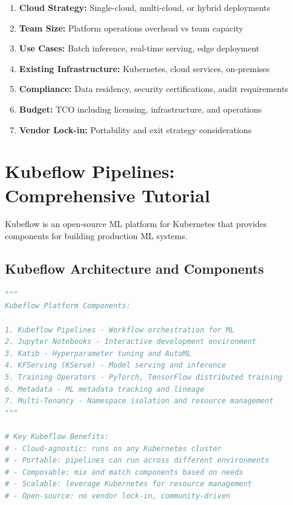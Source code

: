 \begin{enumerate}
    \item \textbf{Cloud Strategy:} Single-cloud, multi-cloud, or hybrid deployments
    \item \textbf{Team Size:} Platform operations overhead vs team capacity
    \item \textbf{Use Cases:} Batch inference, real-time serving, edge deployment
    \item \textbf{Existing Infrastructure:} Kubernetes, cloud services, on-premises
    \item \textbf{Compliance:} Data residency, security certifications, audit requirements
    \item \textbf{Budget:} TCO including licensing, infrastructure, and operations
    \item \textbf{Vendor Lock-in:} Portability and exit strategy considerations
\end{enumerate}

\section{Kubeflow Pipelines: Comprehensive Tutorial}

Kubeflow is an open-source ML platform for Kubernetes that provides components for building production ML systems.

\subsection{Kubeflow Architecture and Components}

\begin{lstlisting}[language=Python, caption=Kubeflow Platform Components Overview]
"""
Kubeflow Platform Components:

1. Kubeflow Pipelines - Workflow orchestration for ML
2. Jupyter Notebooks - Interactive development environment
3. Katib - Hyperparameter tuning and AutoML
4. KFServing (KServe) - Model serving and inference
5. Training Operators - PyTorch, TensorFlow distributed training
6. Metadata - ML metadata tracking and lineage
7. Multi-Tenancy - Namespace isolation and resource management
"""

# Key Kubeflow Benefits:
# - Cloud-agnostic: runs on any Kubernetes cluster
# - Portable: pipelines can run across different environments
# - Composable: mix and match components based on needs
# - Scalable: leverage Kubernetes for resource management
# - Open-source: no vendor lock-in, community-driven
\end{lstlisting}

